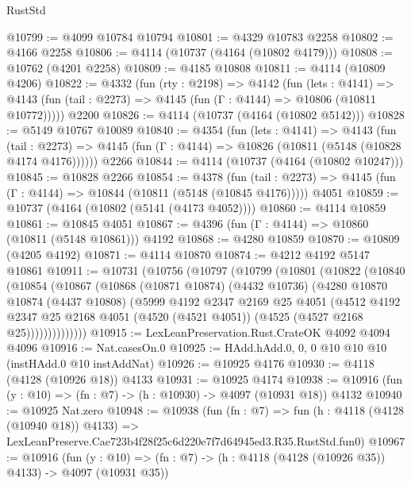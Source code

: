 \begin{lexlean}{RustStd}
\begin{coremodule}
@10799 := @4099 @10784 @10794
@10801 := @4329 @10783 @2258
@10802 := @4166 @2258
@10806 := @4114 (@10737 (@4164 (@10802 @4179)))
@10808 := @10762 (@4201 @2258)
@10809 := @4185 @10808
@10811 := @4114 (@10809 @4206)
@10822 := @4332
    (fun (rty : @2198) =>
    @4142
      (fun (lets : @4141) =>
      @4143 (fun (tail : @2273) => @4145 (fun (Γ : @4144) => @10806 (@10811 @10772)))))
    @2200
@10826 := @4114 (@10737 (@4164 (@10802 @5142)))
@10828 := @5149 @10767 @10089
@10840 := @4354
    (fun (lets : @4141) =>
    @4143
      (fun (tail : @2273) =>
      @4145 (fun (Γ : @4144) => @10826 (@10811 (@5148 (@10828 @4174 @4176))))))
    @2266
@10844 := @4114 (@10737 (@4164 (@10802 @10247)))
@10845 := @10828 @2266
@10854 := @4378
    (fun (tail : @2273) => @4145 (fun (Γ : @4144) => @10844 (@10811 (@5148 (@10845 @4176)))))
    @4051
@10859 := @10737 (@4164 (@10802 (@5141 (@4173 @4052))))
@10860 := @4114 @10859
@10861 := @10845 @4051
@10867 := @4396 (fun (Γ : @4144) => @10860 (@10811 (@5148 @10861))) @4192
@10868 := @4280 @10859
@10870 := @10809 (@4205 @4192)
@10871 := @4114 @10870
@10874 := @4212 @4192 @5147 @10861
@10911 := @10731
    (@10756
      (@10797
        (@10799
          (@10801
            (@10822
              (@10840
                (@10854
                  (@10867
                    (@10868
                      (@10871 @10874)
                      (@4432 @10736)
                      (@4280
                        @10870
                        @10874
                        (@4437 @10808)
                        (@5999
                          @4192
                          @2347
                          @2169
                          @25
                          @4051
                          (@4512
                            @4192
                            @2347
                            @25
                            @2168
                            @4051
                            (@4520 (@4521 @4051))
                            (@4525 (@4527 @2168 @25))))))))))))))
@10915 := LexLeanPreservation.Rust.CrateOK @4092 @4094 @4096
@10916 := Nat.casesOn.{0}
@10925 := HAdd.hAdd.{0, 0, 0} @10 @10 @10 (instHAdd.{0} @10 instAddNat)
@10926 := @10925 @4176
@10930 := @4118 (@4128 (@10926 @18)) @4133
@10931 := @10925 @4174
@10938 := @10916 (fun (y : @10) => (fn : @7) -> (h : @10930) -> @4097 (@10931 @18)) @4132
@10940 := @10925 Nat.zero
@10948 := @10938
    (fun (fn : @7) =>
    fun (h : @4118 (@4128 (@10940 @18)) @4133) =>
    LexLeanPreserve.Cae723b4f28f25c6d220e7f7d64945ed3.R35.RustStd.fun0)
@10967 := @10916
    (fun (y : @10) => (fn : @7) -> (h : @4118 (@4128 (@10926 @35)) @4133) -> @4097 (@10931 @35))

\end{coremodule}
\end{lexlean}
